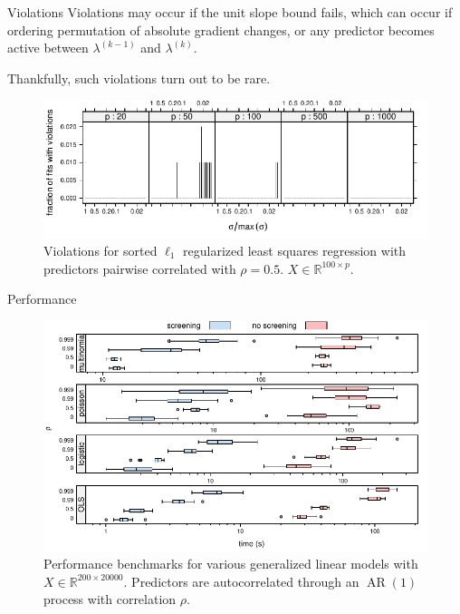\documentclass[10pt,ignorenonframetext]{beamer}
\begin{document}
\begin{frame}{Violations}
  Violations may occur if the unit slope bound fails, which can occur if
  ordering permutation of absolute gradient changes, or any predictor becomes active between
  \(\lambda^{(k-1)}\) and \(\lambda^{(k)}\).\medskip

  Thankfully, such violations turn out to be \alert{rare}.
  \begin{figure}
    \centering
    \includegraphics[width=\linewidth]{figures/violations.pdf}
    \caption{Violations for sorted \(\ell_1\) regularized least squares regression
      with predictors pairwise correlated with \(\rho = 0.5\). \(X\in \mathbb{R}^{100 \times p}\).}
  \end{figure}
\end{frame}

\begin{frame}{Performance}
  \begin{figure}
    \centering
    \includegraphics[width=\linewidth]{figures/performance.pdf}
    \caption{Performance benchmarks for various generalized linear models
      with \(X \in \mathbb{R}^{200 \times 20000}\). Predictors are autocorrelated through an
      \(\operatorname{AR}(1)\) process with correlation \(\rho\).}
  \end{figure}
\end{frame}
\end{document}
